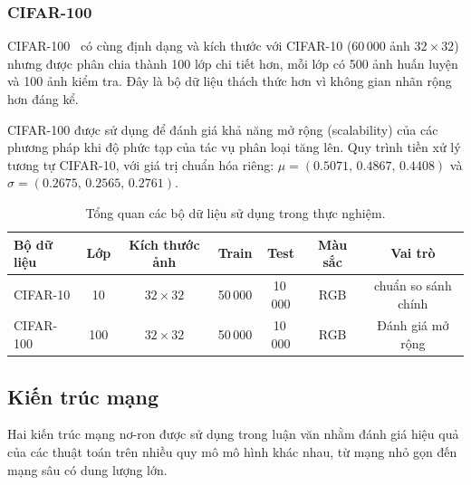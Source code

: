             \subsubsection{CIFAR-100}
            \label{subsec:cifar100}
            
            CIFAR-100~\cite{krizhevsky2009learning} có cùng định dạng và kích thước với
            CIFAR-10 (60\,000 ảnh $32 \times 32$) nhưng được phân chia thành 100 lớp chi
            tiết hơn, mỗi lớp có 500 ảnh huấn luyện và 100 ảnh kiểm tra.
            Đây là bộ dữ liệu thách thức hơn vì không gian nhãn rộng hơn đáng kể.
            
            CIFAR-100 được sử dụng để đánh giá khả năng mở rộng (scalability) của
            các phương pháp \pruning khi độ phức tạp của tác vụ phân loại tăng lên.
            Quy trình tiền xử lý tương tự CIFAR-10, với giá trị chuẩn hóa riêng:
            $\mu = (0.5071,\,0.4867,\,0.4408)$ và
            $\sigma = (0.2675,\,0.2565,\,0.2761)$.
            
            \begin{table}[htbp]
            \centering
            \caption{Tổng quan các bộ dữ liệu sử dụng trong thực nghiệm.}
            \label{tab:datasets}
            \begin{tabular}{lcccccc}
            \hline
            \textbf{Bộ dữ liệu} & \textbf{Lớp} & \textbf{Kích thước ảnh} & \textbf{Train} & \textbf{Test} & \textbf{Màu sắc} & \textbf{Vai trò} \\
            \hline
            CIFAR-10  & 10  & $32\times32$ & 50\,000 & 10\,000 & RGB & chuẩn so sánh chính  \\
            CIFAR-100 & 100 & $32\times32$ & 50\,000 & 10\,000 & RGB & Đánh giá mở rộng \\
            \hline
            \end{tabular}
            \end{table}

        \subsection{Kiến trúc mạng}
        Hai kiến trúc mạng nơ-ron được sử dụng trong luận văn nhằm đánh giá
    hiệu quả của các thuật toán \pruning trên nhiều quy mô mô hình khác nhau,
    từ mạng nhỏ gọn đến mạng sâu có dung lượng lớn.
    
